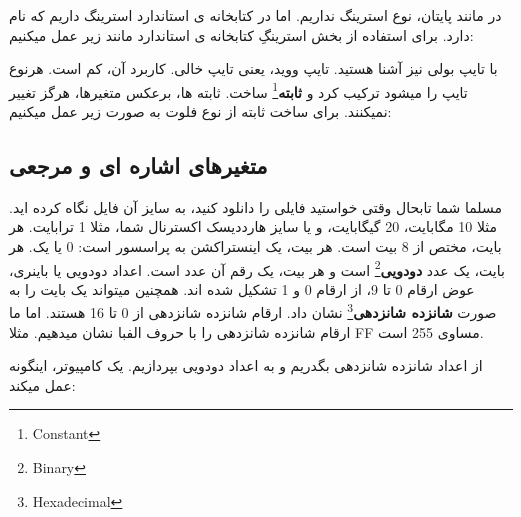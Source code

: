 \documentclass[14pt,a4paper]{memoir}
\begin{document}
	 در  مانند پایتان، نوع استرینگ نداریم. اما در کتابخانه ی استاندارد استرینگ داریم که  نام دارد. برای استفاده از بخش استرینگِ کتابخانه ی استاندارد مانند زیر عمل میکنیم:
	 
	 
	 
	 	 		 	 	 	 \begin{latin}
	 	
	 \end{latin}
	 
	 
	 
	 
	 با تایپ بولی نیز آشنا هستید. تایپ ووید، یعنی تایپ خالی. کاربرد آن، کم است.
	 هرنوع تایپ را میشود ترکیب کرد و \textbf{ثابته}\footnote{Constant} ساخت. ثابته ها، برعکس متغیرها، هرگز تغییر نمیکنند. برای ساخت ثابته از نوع فلوت به صورت زیر عمل میکنیم:
	 
	 \begin{latin}
	 	
	 \end{latin}
	 
	 
	 \subsection{متغیرهای اشاره ای و مرجعی}\label{refpointer}
	 
	 مسلما شما تابحال وقتی خواستید فایلی را دانلود کنید، به سایز آن فایل نگاه کرده اید. مثلا 10 مگابایت، 20 گیگابایت، و یا سایز هارددیسک اکسترنال شما، مثلا 1 ترابایت. هر بایت، مختص از 8 بیت است. هر بیت، یک اینستراکشن به پراسسور است: 0 یا یک. هر بایت، یک عدد \textbf{دودویی}\footnote{Binary} است و هر بیت، یک رقم آن عدد است. اعداد دودویی یا باینری، عوض ارقام 0 تا 9، از ارقام 0 و 1 تشکیل شده اند. همچنین میتواند یک بایت را به صورت \textbf{شانزده شانزدهی}\footnote{Hexadecimal} نشان داد. ارقام شانزده شانزدهی از 0 تا 16 هستند. اما ما ارقام شانزده شانزدهی را با حروف الفبا نشان میدهیم. مثلا FF مساوی 255 است.
	 	
	 از اعداد شانزده شانزدهی بگدریم و به اعداد دودویی بپردازیم. یک کامپیوتر، اینگونه عمل میکند:
	 
\end{document}
